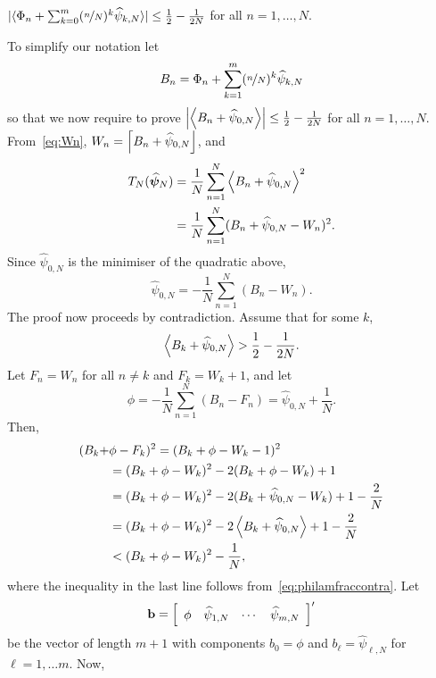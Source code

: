 \documentclass[journal]{IEEEtran}
\begin{document}
\begin{lemma}\label{lem:boundonhatlambda} $\vert \langle \Phi_n + \sum_{k=0}^m (\nicefrac{n}{N})^k \widehat{\psi}_{k,N} \rangle \vert \leq \frac{1}{2} - \frac{1}{2N}$ for all $n = 1, \dots, N$.
\end{lemma}
\begin{IEEEproof}
To simplify our notation let 
\[
B_n = \Phi_n + \sum_{k=1}^m (\nicefrac{n}{N})^k \widehat{\psi}_{k,N}
\]
so that we now require to prove $\left\vert \left\langle B_n + \widehat{\psi}_{0,N} \right\rangle \right\vert \leq \frac{1}{2} - \frac{1}{2N}$
for all $n = 1, \dots, N$.  From~\eqref{eq:Wn}, $W_n = {\left\lceil B_n + \widehat{\psi}_{0,N} \right\rfloor}$, and 
\begin{align*}
T_N(\widehat{\boldsymbol{\psi}}_N) &= \frac{1}{N}\sum_{n=1}^N \left\langle B_n + \widehat{\psi}_{0,N} \right\rangle^2
\\ &= \frac{1}{N}\sum_{n=1}^N (B_n + \widehat{\psi}_{0,N} - W_n)^2.
\end{align*}
Since $\widehat{\psi}_{0,N}$ is the minimiser of the quadratic above,
\begin{equation}\label{eq:lamsum}
\widehat{\psi}_{0,N} = -\frac{1}{N}\sum_{n=1}^N(B_n - W_n).
\end{equation}
The proof now proceeds by contradiction.  Assume that for some $k$,
\begin{equation}\label{eq:philamfraccontra}
\fracpart{B_k + \widehat{\psi}_{0,N}} > \frac{1}{2} - \frac{1}{2N}.
\end{equation}
Let $F_n = W_n$ for all $n \neq k$ and $F_k = W_k + 1$, and let
\[
\phi = -\frac{1}{N}\sum_{n=1}^N(B_n - F_n) = \widehat{\psi}_{0,N} + \frac{1}{N}.
\]
Then,
\begin{align}
(B_k + &\phi - F_k)^2 = (B_k + \phi - W_k - 1)^2 \nonumber \\
&= (B_k + \phi - W_k)^2 - 2(B_k + \phi - W_k) + 1 \nonumber \\
&= (B_k + \phi - W_k)^2 - 2(B_k + \widehat{\psi}_{0,N} - W_k) + 1 - \frac{2}{N} \nonumber \\
&= (B_k + \phi - W_k)^2 - 2\fracpart{B_k + \widehat{\psi}_{0,N}} + 1 - \frac{2}{N} \nonumber \\
&< (B_k + \phi - W_k)^2 - \frac{1}{N}, \label{eq:Bkineq}
\end{align}
where the inequality in the last line follows from~\eqref{eq:philamfraccontra}. Let
\[
\bbf = \left[
\begin{array}
[c]{cccc}%
\phi & \widehat{\psi}_{1,N} & \cdots & \widehat{\psi}_{m,N}
\end{array}
\right]^\prime
\]
be the vector of length $m+1$ with components $b_0 = \phi$ and $b_\ell = \widehat{\psi}_{\ell,N}$ for $\ell = 1 , \dots m$.  Now,

\end{IEEEproof}
\end{document}
